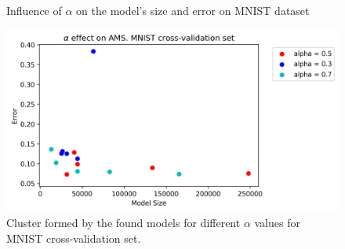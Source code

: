 \documentclass[journal]{IEEEtran}
\begin{document}
\begin{figure}[!h]
\centering
{}
\caption{Influence of $\alpha$ on the model's size and error on MNIST dataset}
\label{fig:alpha_mnist}
\end{figure}

\begin{figure}[!h]
\centering
\includegraphics[scale=0.7]{img/alpha_mnist_cvset.png}
\caption{Cluster formed by the found models for different $\alpha$ values for MNIST cross-validation set.}
\label{fig:alpha_mnist_cluster_cvset}
\end{figure}
\end{document}
